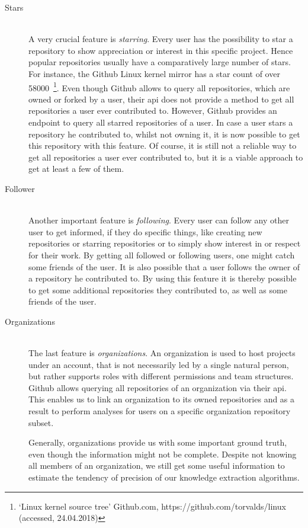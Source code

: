\begin{description}
    \item[Stars] \hfill \\
        A very crucial feature is \emph{starring}. Every user has the possibility to star a repository to show appreciation or interest in this specific project.
        Hence popular repositories usually have a comparatively large number of stars. For instance, the Github Linux kernel mirror has a star count of over 58000~\footnote{`Linux kernel source tree' Github.com, https://github.com/torvalds/linux (accessed, 24.04.2018)}.
        Even though Github allows to query all repositories, which are owned or forked by a user, their \ac{api} does not provide a method to get all repositories a user ever contributed to.
        However, Github provides an endpoint to query all starred repositories of a user.
        In case a user stars a repository he contributed to, whilst not owning it, it is now possible to get this repository with this feature.
        Of course, it is still not a reliable way to get all repositories a user ever contributed to, but it is a viable approach to get at least a few of them.

    \item[Follower] \hfill \\
        Another important feature is \emph{following}.
        Every user can follow any other user to get informed, if they do specific things, like creating new repositories or starring repositories or to simply show interest in or respect for their work.
        By getting all followed or following users, one might catch some friends of the user.
        It is also possible that a user follows the owner of a repository he contributed to.
        By using this feature it is thereby possible to get some additional repositories they contributed to, as well as some friends of the user.

    \item[Organizations] \hfill \\
        The last feature is \emph{organizations}.
        An organization is used to host projects under an account, that is not necessarily led by a single natural person, but rather supports roles with different permissions and team structures.
        Github allows querying all repositories of an organization via their \ac{api}.
        This enables us to link an organization to its owned repositories and as a result to perform analyses for users on a specific organization repository subset.

        Generally, organizations provide us with some important ground truth, even though the information might not be complete.
        Despite not knowing all members of an organization, we still get some useful information to estimate the tendency of precision of our knowledge extraction algorithms.
\end{description}
